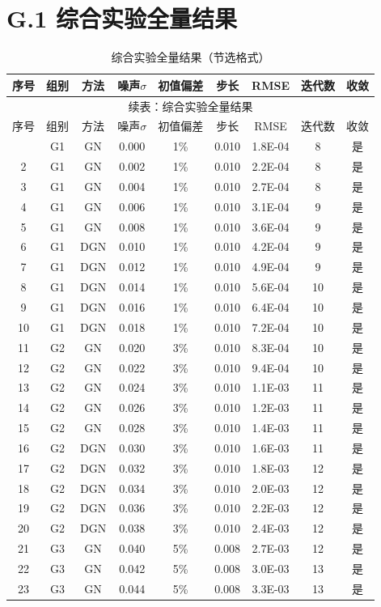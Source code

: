 \section*{G.1 综合实验全量结果}
{
\scriptsize
\begin{longtable}{ccccccccc}
\caption{综合实验全量结果（节选格式）}\\
\toprule
序号 & 组别 & 方法 & 噪声$\sigma$ & 初值偏差 & 步长 & RMSE & 迭代数 & 收敛\\
\midrule
\endfirsthead
\multicolumn{9}{c}{续表：综合实验全量结果}\\
\toprule
序号 & 组别 & 方法 & 噪声$\sigma$ & 初值偏差 & 步长 & RMSE & 迭代数 & 收敛\\
\midrule
\endhead
\bottomrule
\endfoot
1&G1&GN&0.000&1\%&0.010&1.8E-04&8&是\\
2&G1&GN&0.002&1\%&0.010&2.2E-04&8&是\\
3&G1&GN&0.004&1\%&0.010&2.7E-04&8&是\\
4&G1&GN&0.006&1\%&0.010&3.1E-04&9&是\\
5&G1&GN&0.008&1\%&0.010&3.6E-04&9&是\\
6&G1&DGN&0.010&1\%&0.010&4.2E-04&9&是\\
7&G1&DGN&0.012&1\%&0.010&4.9E-04&9&是\\
8&G1&DGN&0.014&1\%&0.010&5.6E-04&10&是\\
9&G1&DGN&0.016&1\%&0.010&6.4E-04&10&是\\
10&G1&DGN&0.018&1\%&0.010&7.2E-04&10&是\\
11&G2&GN&0.020&3\%&0.010&8.3E-04&10&是\\
12&G2&GN&0.022&3\%&0.010&9.4E-04&10&是\\
13&G2&GN&0.024&3\%&0.010&1.1E-03&11&是\\
14&G2&GN&0.026&3\%&0.010&1.2E-03&11&是\\
15&G2&GN&0.028&3\%&0.010&1.4E-03&11&是\\
16&G2&DGN&0.030&3\%&0.010&1.6E-03&11&是\\
17&G2&DGN&0.032&3\%&0.010&1.8E-03&12&是\\
18&G2&DGN&0.034&3\%&0.010&2.0E-03&12&是\\
19&G2&DGN&0.036&3\%&0.010&2.2E-03&12&是\\
20&G2&DGN&0.038&3\%&0.010&2.4E-03&12&是\\
21&G3&GN&0.040&5\%&0.008&2.7E-03&12&是\\
22&G3&GN&0.042&5\%&0.008&3.0E-03&13&是\\
23&G3&GN&0.044&5\%&0.008&3.3E-03&13&是\\

\end{longtable}}
